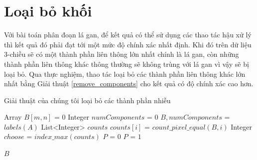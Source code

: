 \section{Loại bỏ khối}
Với bài toán phân đoạn lá gan, để kết quả có thể sử dụng các thao tác hậu xử lý thì kết quả đó phải đạt tới một mức độ chính xác nhất định. Khi đó trên dữ liệu 3-chiều sẽ có một thành phần liên thông lớn nhất chính là lá gan, còn những thành phần liên thông khác thông thường sẽ không trùng với lá gan vì vậy sẽ bị loại bỏ. Qua thực nghiệm, thao tác loại bỏ các thành phần liên thông khác lớn nhất bằng Giải thuật \ref{remove_components} cho kết quả có độ chính xác cao hơn.\\
\begin{algorithm}
  \caption{Giải thuật của chúng tôi loại bỏ các thành phần nhiễu}\label{remove_components}
  \begin{algorithmic}[1]
    \State Array $B[m,n]$ = $0$
    \State Integer $numComponents$ = $0$
    \State $B, numComponents$ = $labels(A)$ 
    \State List<Integer> $counts$
        \State $counts[i]$ = $count\_pixel\_equal(B, i)$
    \EndFor
    \State Integer $choose$ = $index\_max(counts)$
            \State $P$ = $0$ 
        \Else
            \State $P$ = $1$
        \EndIf
    \EndFor
    
    \State \Return $B$
    \EndProcedure
  \end{algorithmic}
\end{algorithm}

